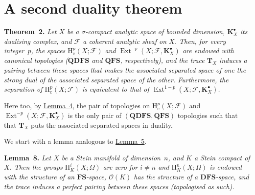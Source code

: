 \documentclass[british]{article}
\newenvironment{itenv}[1]
  {\phantomsection\par\smallskip\noindent\textbf{#1.}\itshape}
  {\par\smallskip}
\newcommand{\oldpage}[1]{\marginpar{\footnotesize$\Big\vert$ \textit{p.~#1}}}
\begin{document}
\section{A second duality theorem}\label{section-4}

\protect{}\label{theorem-2}
\begin{itenv}{Theorem 2}
Let \(X\) be a \(\sigma\)-compact analytic space of bounded dimension,
\(\mathbf{K}_X^\bullet\) its dualising complex, and \({\mathscr{F}}\) a
coherent analytic sheaf on \(X\). Then, for every integer~\(p\), the
spaces \(\mathrm{H}_\mathrm{c}^p(X;{\mathscr{F}})\) and
\(\operatorname{Ext}^{-p}(X;{\mathscr{F}},\mathbf{K}_X^\bullet)\) are
endowed with canonical topologies (\(\mathbf{QDFS}\) and
\(\mathbf{QFS}\), respectively), and the trace \(\mathbf{T}_X\) induces
a pairing between these spaces that makes the associated separated space
of one the strong dual of the associated separated space of the other.
\oldpage{83} Furthermore, the separation of
\(\mathrm{H}_\mathrm{c}^p(X;{\mathscr{F}})\) is equivalent to that of
\(\operatorname{Ext}^{1-p}(X;{\mathscr{F}},\mathbf{K}_X^\bullet)\).

\end{itenv}

Here too, by \hyperref[lemma-4]{Lemma~4}, the pair of topologies on
\(\mathrm{H}_\mathrm{c}^p(X;{\mathscr{F}})\) and
\(\operatorname{Ext}^{-p}(X;{\mathscr{F}},\mathbf{K}_X^\bullet)\) is the
only pair of \((\mathbf{QDFS},\mathbf{QFS})\) topologies such that that
\(\mathbf{T}_X\) puts the associated separated spaces in duality.

We start with a lemma analogous to \hyperref[lemma-5]{Lemma~5}.

\protect{}\label{lemma-8}
\begin{itenv}{Lemma 8}
Let \(X\) be a Stein manifold of dimension~\(n\), and \(K\) a Stein
compact of \(X\). Then the groups \(\mathrm{H}_K^i(X;\Omega)\) are zero
for \(i\neq n\) and \(\mathrm{H}_K^n(X;\Omega)\) is endowed with the
structure of an \(\mathbf{FS}\)-space, \({\mathscr{O}}(K)\) has the
structure of a \(\mathbf{DFS}\)-space, and the trace induces a perfect
pairing between these spaces (topologised as such).

\end{itenv}
\end{document}
